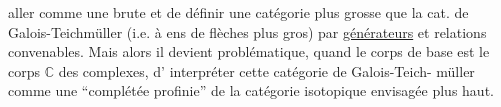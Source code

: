 aller comme une brute et de définir
une catégorie plus grosse que la cat.
de Galois-Teichmüller (i.e. à ens
de flèches plus gros) par \uline{générateurs}
et relations convenables. Mais alors il
devient problématique, quand le corps de
base est le corps $\mathbb C$ des complexes, d'
interpréter cette catégorie de Galois-Teich-
müller comme une ``complétée profinie''
de la catégorie isotopique envisagée plus
haut.

